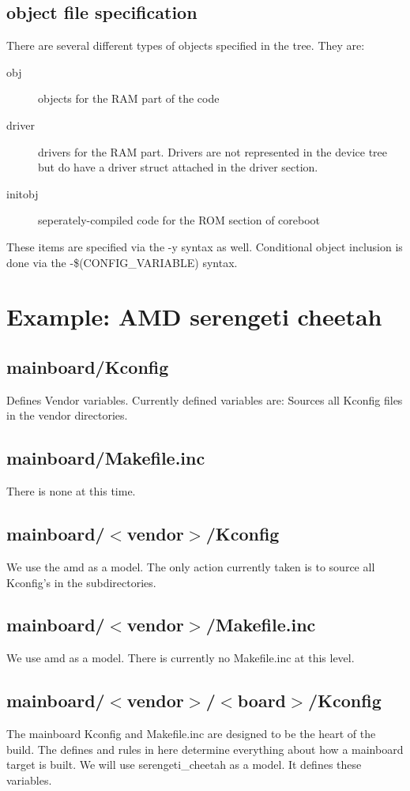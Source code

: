 \documentclass[10pt,letterpaper]{article}
\begin{document}
\subsection{object file specification}
There are several different types of objects specified in the tree. They are:
\begin{description}
\item[obj]objects for the RAM part of the code
\item[driver]drivers for the RAM part. Drivers are not represented in the device tree but do have a driver struct attached in the driver section.
\item[initobj]seperately-compiled code for the ROM section of coreboot
\end{description}
These items are specified via the -y syntax as well. Conditional object inclusion is done via the -\$(CONFIG\_VARIABLE) syntax.

\section{Example: AMD serengeti cheetah}
\subsection{mainboard/Kconfig}
Defines Vendor variables. Currently defined variables are:
Sources all Kconfig files in the vendor directories.

\subsection{mainboard/Makefile.inc}
There is none at this time.
\subsection{mainboard/$<$vendor$>$/Kconfig}
We use the amd as a model. The only action currently taken is to source all Kconfig's in the
subdirectories.
\subsection{mainboard/$<$vendor$>$/Makefile.inc}
We use amd as a model. There is currently no Makefile.inc at this level.
\subsection{mainboard/$<$vendor$>$/$<$board$>$/Kconfig}
The mainboard Kconfig and Makefile.inc are designed to be the heart of the build. The defines
and rules in here determine everything about how a mainboard target is built.
We will use serengeti\_cheetah as a model. It defines these variables.

\end{document}
